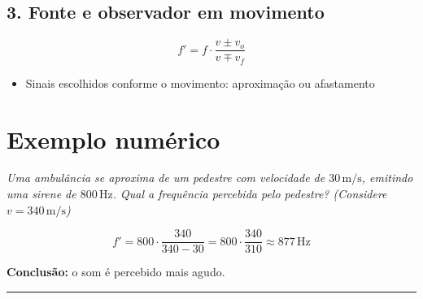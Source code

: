 \documentclass[a4paper,12pt]{article}
\begin{document}
\subsection{3. Fonte e observador em movimento}

\[
f' = f \cdot \frac{v \pm v_o}{v \mp v_f}
\]

\begin{itemize}
  \item Sinais escolhidos conforme o movimento: aproximação ou afastamento
\end{itemize}

\section{Exemplo numérico}

\textit{Uma ambulância se aproxima de um pedestre com velocidade de \(30 \, \text{m/s}\), emitindo uma sirene de \(800\,\text{Hz}\). Qual a frequência percebida pelo pedestre? (Considere \(v = 340\,\text{m/s}\))}

\[
f' = 800 \cdot \frac{340}{340 - 30} = 800 \cdot \frac{340}{310} \approx 877\,\text{Hz}
\]

\textbf{Conclusão:} o som é percebido mais agudo.

\noindent\rule{\linewidth}{0.6pt}\\
\end{document}
